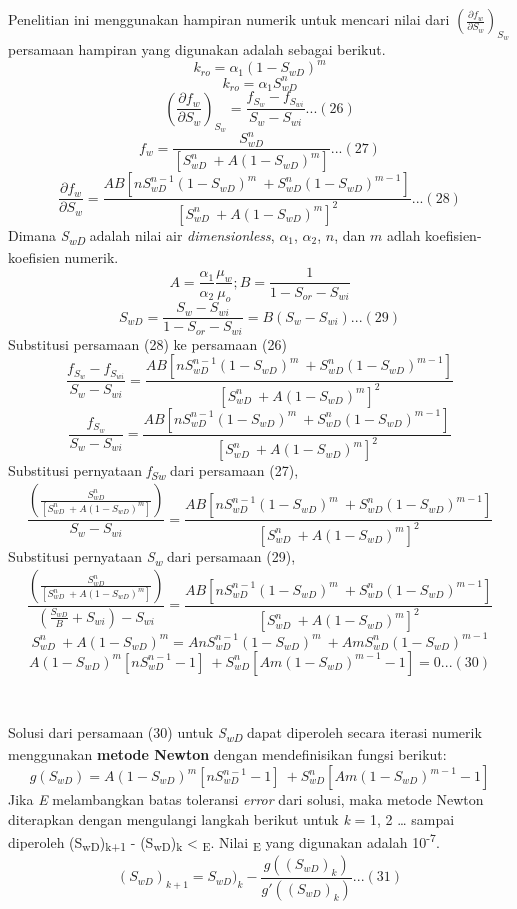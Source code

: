 \documentclass[
]{book}
\begin{document}
Penelitian ini menggunakan hampiran numerik untuk mencari nilai dari \(\left( \frac{\partial f_w}{\partial S_w} \right)_{S_w}\) persamaan hampiran yang digunakan adalah sebagai berikut.
\[k_{ro} = \alpha _1 (1-S_{wD})^m\]
\[k_{ro} = \alpha _1 S_{wD}^n\]
\[\left( \frac{\partial f_w}{\partial S_w} \right)_{S_w} = \frac{f_{S_w}-f_{S_{wi}}}{S_w - S_{wi}} ...(26) \]
\[f_w = \frac{S_{wD}^n}{[S_{wD}^n\ + A(1-S_{wD})^m ]}...(27)\]
\[\frac{\partial f_w}{\partial S_w} = \frac{AB[nS_{wD}^{n-1}(1-S_{wD})^m\ + S_{wD}^n(1-S_{wD})^{m-1}]}{[S_{wD}^n\ + A(1-S_{wD})^m ]^2}...(28)\]
Dimana \emph{S\textsubscript{wD}} adalah nilai air \emph{dimensionless}, \(\alpha _1\), \(\alpha _2\), \(n\), dan \(m\) adlah koefisien-koefisien numerik.
\[A = \frac{\alpha _1}{\alpha _2}\frac{\mu_w}{\mu_o};B = \frac{1}{1-S_{or}-S_{wi}}\]
\[S_{wD} = \frac{S_{w}-S_{wi}}{1-S_{or}-S_{wi}} = B(S_{w}-S_{wi})...(29)\]
Substitusi persamaan (28) ke persamaan (26)
\[ \frac{f_{S_w}-f_{S_{wi}}}{S_w - S_{wi}} = \frac{AB[nS_{wD}^{n-1}(1-S_{wD})^m\ + S_{wD}^n(1-S_{wD})^{m-1}]}{[S_{wD}^n\ + A(1-S_{wD})^m ]^2} \]
\[ \frac{f_{S_w}}{S_w - S_{wi}} = \frac{AB[nS_{wD}^{n-1}(1-S_{wD})^m\ + S_{wD}^n(1-S_{wD})^{m-1}]}{[S_{wD}^n\ + A(1-S_{wD})^m ]^2} \]
Substitusi pernyataan \emph{f\textsubscript{Sw}} dari persamaan (27),
\[  \frac{\left( \frac{S_{wD}^n}{[S_{wD}^n\ + A(1-S_{wD})^m ]}\right)}  {S_w - S_{wi}} = \frac{AB[nS_{wD}^{n-1}(1-S_{wD})^m\ + S_{wD}^n(1-S_{wD})^{m-1}]}{[S_{wD}^n\ + A(1-S_{wD})^m ]^2} \]
Substitusi pernyataan \emph{S\textsubscript{w}} dari persamaan (29),
\[  \frac{\left( \frac{S_{wD}^n}{[S_{wD}^n\ + A(1-S_{wD})^m ]}\right)}  {\left(\frac{S_{wD}}{B} + S_{wi} \right) - S_{wi}} = \frac{AB[nS_{wD}^{n-1}(1-S_{wD})^m\ + S_{wD}^n(1-S_{wD})^{m-1}]}{[S_{wD}^n\ + A(1-S_{wD})^m ]^2} \]
\[S_{wD}^n\ + A(1-S_{wD})^m = AnS_{wD}^{n-1}(1-S_{wD})^m\ + AmS_{wD}^n(1-S_{wD})^{m-1} \]
\[A(1-S_{wD})^m[nS_{wD}^{n-1}-1]\ + S_{wD}^n[Am(1-S_{wD})^{m-1}-1] = 0 ...(30)\]

~

Solusi dari persamaan (30) untuk \emph{S\textsubscript{wD}} dapat diperoleh secara iterasi numerik menggunakan \textbf{metode Newton} dengan mendefinisikan fungsi berikut:
\[g(S_{wD}) = A(1-S_{wD})^m[nS_{wD}^{n-1}-1]\ + S_{wD}^n[Am(1-S_{wD})^{m-1}-1]\]
Jika \emph{E} melambangkan batas toleransi \emph{error} dari solusi, maka metode Newton diterapkan dengan mengulangi langkah berikut untuk \emph{k} = 1, 2 \ldots{} sampai diperoleh \textbar(S\textsubscript{wD})\textsubscript{k+1} - (S\textsubscript{wD})\textsubscript{k}\textbar{} \textless{} \textsubscript{E}. Nilai \textsubscript{E} yang digunakan adalah 10\textsuperscript{-7}.
\[(S_{wD})_{k+1} = S_{wD})_k - \frac{g((S_{wD})_k)}{g'((S_{wD})_k)}...(31)\]
\end{document}
